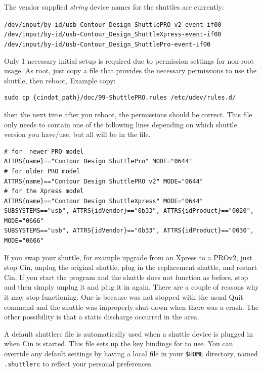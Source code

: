 The vendor supplied \textit{string} device names for the shuttles
are currently:

\texttt{/dev/input/by-id/usb-Contour\_Design\_ShuttlePRO\_v2-event-if00}\\
\texttt{/dev/input/by-id/usb-Contour\_Design\_ShuttleXpress-event-if00}\\
\texttt{/dev/input/by-id/usb-Contour\_Design\_ShuttlePro-event-if00}

Only 1 necessary initial setup is required due to permission
settings for non-root usage. As root, just copy a file that provides
the necessary permissions to use the shuttle, then reboot, Example
copy:

\begin{lstlisting}[style=sh]
sudo cp {cindat_path}/doc/99-ShuttlePRO.rules /etc/udev/rules.d/
\end{lstlisting}

then the next time after you reboot, the permissions should be
correct. This file only needs to contain one of the following lines
depending on which shuttle version you have/use, but all will be in
the file.

\begin{lstlisting}[style=sh]
# for  newer PRO model
ATTRS{name}=="Contour Design ShuttlePro" MODE="0644"
# for older PRO model
ATTRS{name}=="Contour Design ShuttlePRO v2" MODE="0644"
# for the Xpress model
ATTRS{name}=="Contour Design ShuttleXpress" MODE="0644"
SUBSYSTEMS=="usb", ATTRS{idVendor}=="0b33", ATTRS{idProduct}=="0020", MODE="0666"
SUBSYSTEMS=="usb", ATTRS{idVendor}=="0b33", ATTRS{idProduct}=="0030", MODE="0666"
\end{lstlisting}

If you swap your shuttle, for example upgrade from an Xpress to a
PROv2, just stop Cin, unplug the original shuttle, plug in the
replacement shuttle, and restart Cin.  If you start the \CGG{}
program and the shuttle does not function as before, stop \CGG{} and
then simply unplug it and plug it in again.  There are a couple of
reasons why it may stop functioning.  One is because \CGG{} was not
stopped with the usual Quit command and the shuttle was improperly
shut down when there was a crash.  The other possibility is that a
static discharge occurred in the area.

A default shuttlerc file is automatically used when a shuttle device
is plugged in when Cin is started. This file sets up the key
bindings for \CGG{} to use. You can override any default settings by
having a local file in your \texttt{\$HOME} directory, named
\texttt{.shuttlerc} to reflect your personal preferences.


